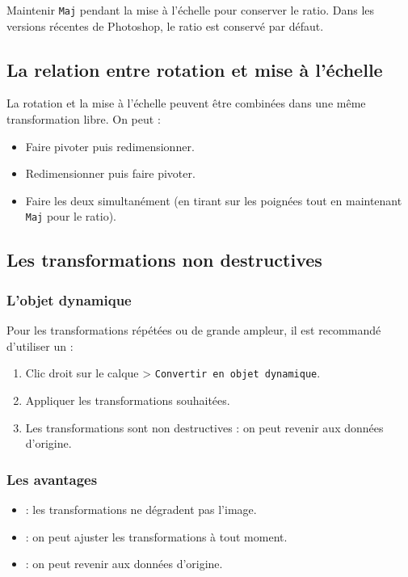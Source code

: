 Maintenir \texttt{Maj} pendant la mise à l'échelle pour conserver le ratio. Dans les versions récentes de Photoshop, le ratio est conservé par défaut.

\subsection{La relation entre rotation et mise à l'échelle}

La rotation et la mise à l'échelle peuvent être combinées dans une même transformation libre. On peut :

\begin{itemize}
    \item Faire pivoter puis redimensionner.
    \item Redimensionner puis faire pivoter.
    \item Faire les deux simultanément (en tirant sur les poignées tout en maintenant \texttt{Maj} pour le ratio).
\end{itemize}

\subsection{Les transformations non destructives}

\subsubsection{L'objet dynamique}

Pour les transformations répétées ou de grande ampleur, il est recommandé d'utiliser un  :

\begin{enumerate}
    \item Clic droit sur le calque > \texttt{Convertir en objet dynamique}.
    \item Appliquer les transformations souhaitées.
    \item Les transformations sont non destructives : on peut revenir aux données d'origine.
\end{enumerate}

\subsubsection{Les avantages}

\begin{itemize}
    \item {} : les transformations ne dégradent pas l'image.
    \item {} : on peut ajuster les transformations à tout moment.
    \item {} : on peut revenir aux données d'origine.
\end{itemize}

